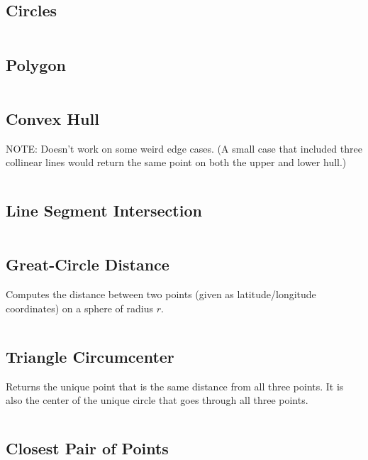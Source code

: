\documentclass[8pt,a4paper,landscape,oneside]{amsart}
\newcommand{\code}[1]{\inputminted[fontsize=\normalsize,baselinestretch=1]{cpp}{_code/#1}}
\newif\ifverbose
\begin{document}
\begin{multicols*}{3}
    \subsection{Circles}
        \ifverbose
        Circle related functions.
        \fi
        \code{geometry/circles.cpp}

    \subsection{Polygon}
        \ifverbose
        Polygon primitives.
        \fi
        \code{geometry/polygon.cpp}

    \subsection{Convex Hull}
        \ifverbose
        An algorithm that finds the Convex Hull of a set of points.
        \fi
        NOTE: Doesn't work on some weird edge cases. (A small case that
        included three collinear lines would return the same point on both the
        upper and lower hull.)
        \code{geometry/convex_hull.cpp}

    \subsection{Line Segment Intersection}
        \ifverbose
        Computes the intersection between two line segments.
        \fi
        \code{geometry/line_segment_intersect.cpp}

    \subsection{Great-Circle Distance}
        Computes the distance between two points (given as latitude/longitude
        coordinates) on a sphere of radius $r$.
        \code{geometry/gc_distance.cpp}

    \subsection{Triangle Circumcenter}
        Returns the unique point that is the same distance from all three
        points. It is also the center of the unique circle that goes through
        all three points.
        \code{geometry/circumcenter.cpp}

    \subsection{Closest Pair of Points}
        \ifverbose
        A sweep line algorithm for computing the distance between the closest
        pair of points.
        \fi
        \code{geometry/closest_pair.cpp}


\end{multicols*}
\end{document}
